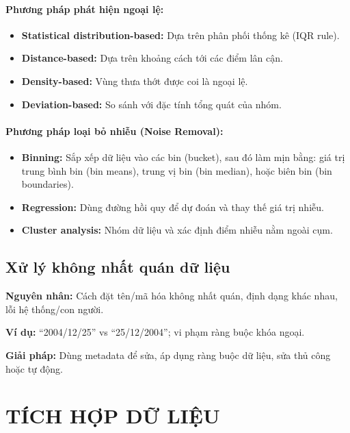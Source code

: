 \documentclass[10pt]{article}
\begin{document}
\paragraph{Phương pháp phát hiện ngoại lệ:}
\begin{itemize}
    \item \textbf{Statistical distribution-based:} Dựa trên phân phối thống kê (IQR rule).
    \item \textbf{Distance-based:} Dựa trên khoảng cách tới các điểm lân cận.
    \item \textbf{Density-based:} Vùng thưa thớt được coi là ngoại lệ.
    \item \textbf{Deviation-based:} So sánh với đặc tính tổng quát của nhóm.
\end{itemize}

\paragraph{Phương pháp loại bỏ nhiễu (Noise Removal):}
\begin{itemize}
    \item \textbf{Binning:} Sắp xếp dữ liệu vào các bin (bucket), sau đó làm mịn bằng: giá trị trung bình bin (bin means), trung vị bin (bin median), hoặc biên bin (bin boundaries).
    \item \textbf{Regression:} Dùng đường hồi quy để dự đoán và thay thế giá trị nhiễu.
    \item \textbf{Cluster analysis:} Nhóm dữ liệu và xác định điểm nhiễu nằm ngoài cụm.
\end{itemize}

\subsection{Xử lý không nhất quán dữ liệu}

\textbf{Nguyên nhân:} Cách đặt tên/mã hóa không nhất quán, định dạng khác nhau, lỗi hệ thống/con người.

\textbf{Ví dụ:} ``2004/12/25'' vs ``25/12/2004''; vi phạm ràng buộc khóa ngoại.

\textbf{Giải pháp:} Dùng metadata để sửa, áp dụng ràng buộc dữ liệu, sửa thủ công hoặc tự động.

\section{TÍCH HỢP DỮ LIỆU}
\end{document}
